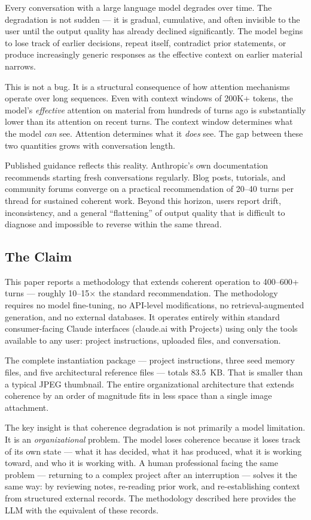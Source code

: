 \documentclass[11pt,a4paper]{article}
\begin{document}
Every conversation with a large language model degrades over time. The degradation is not sudden --- it is gradual, cumulative, and often invisible to the user until the output quality has already declined significantly. The model begins to lose track of earlier decisions, repeat itself, contradict prior statements, or produce increasingly generic responses as the effective context on earlier material narrows.

This is not a bug. It is a structural consequence of how attention mechanisms operate over long sequences. Even with context windows of 200K+ tokens, the model's \textit{effective} attention on material from hundreds of turns ago is substantially lower than its attention on recent turns. The context window determines what the model \textit{can} see. Attention determines what it \textit{does} see. The gap between these two quantities grows with conversation length.

Published guidance reflects this reality. Anthropic's own documentation recommends starting fresh conversations regularly. Blog posts, tutorials, and community forums converge on a practical recommendation of 20--40 turns per thread for sustained coherent work. Beyond this horizon, users report drift, inconsistency, and a general ``flattening'' of output quality that is difficult to diagnose and impossible to reverse within the same thread.

\subsection{The Claim}

This paper reports a methodology that extends coherent operation to 400--600+ turns --- roughly 10--15$\times$ the standard recommendation. The methodology requires no model fine-tuning, no API-level modifications, no retrieval-augmented generation, and no external databases. It operates entirely within standard consumer-facing Claude interfaces (claude.ai with Projects) using only the tools available to any user: project instructions, uploaded files, and conversation.

The complete instantiation package --- project instructions, three seed memory files, and five architectural reference files --- totals 83.5~KB. That is smaller than a typical JPEG thumbnail. The entire organizational architecture that extends coherence by an order of magnitude fits in less space than a single image attachment.

The key insight is that coherence degradation is not primarily a model limitation. It is an \textit{organizational} problem. The model loses coherence because it loses track of its own state --- what it has decided, what it has produced, what it is working toward, and who it is working with. A human professional facing the same problem --- returning to a complex project after an interruption --- solves it the same way: by reviewing notes, re-reading prior work, and re-establishing context from structured external records. The methodology described here provides the LLM with the equivalent of these records.
\end{document}
